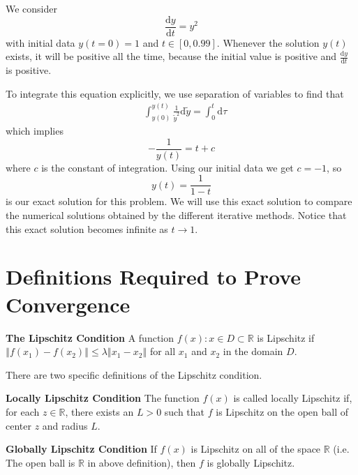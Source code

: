 We consider
\begin{equation}
\frac{\mathrm{d}y}{\mathrm{d}t}=y^{2}
\end{equation}
with initial data $y(t=0)=1$ and $t\in[0,0.99]$.  Whenever the solution $y(t)$ exists, it will be positive all the time, because the initial value is positive and $\frac{\mathrm{d}y}{\mathrm{d}t}$ is positive. 

To integrate this equation explicitly, we use separation of variables to find that
\begin{align}
&{}\int_{y(0)}^{y(t)}\frac{1}{\tilde{y}^{2}}\mathrm{d}\tilde{y}=\int_0^t\mathrm{d}\tau
\end{align}
which implies 
\begin{equation}
-\frac{1}{y(t)}=t+c
\end{equation}
where $c$ is the constant of integration. Using our initial data we get $c=-1$, so
\begin{equation}
y(t)=\frac{1}{1-t}
\end{equation}
is our exact solution for this problem. We will use this exact solution to compare the numerical solutions obtained by the different iterative methods. Notice that this exact solution becomes infinite as $t\rightarrow1$. 

\section{Definitions Required to Prove Convergence}

\begin{definition}{\bf The Lipschitz Condition}
A function $f(x):x\in D\subset\mathbb{R}$ is Lipschitz if $\left\Vert f(x_1)-f(x_2)\right\Vert \leq\lambda\left\Vert x_1-x_2\right\Vert $ for all $x_1$ and $x_2$ in the domain $D$.
\end{definition}

There are two specific definitions of the Lipschitz condition.

\begin{definition}{\bf Locally Lipschitz Condition}
The function $f(x)$ is called locally Lipschitz if, for each $z\in\mathbb{R}$, there exists an $L>0$ such that $f$ is Lipschitz on the open ball of center $z$ and radius $L$. 
\end{definition}

\begin{definition}{\bf Globally Lipschitz Condition}
If $f(x)$ is Lipschitz on all of the space $\mathbb{R}$ (i.e. The open ball is $\mathbb{R}$ in above definition), then $f$ is globally Lipschitz.
\end{definition}

